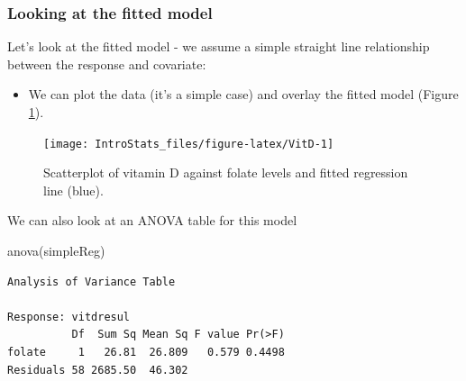 \documentclass[
  oneside]{krantz}
\newenvironment{Shaded}{\begin{snugshade}}{\end{snugshade}}
\newcommand{\AttributeTok}[1]{\textcolor[rgb]{0.77,0.63,0.00}{#1}}
\newcommand{\CommentTok}[1]{\textcolor[rgb]{0.56,0.35,0.01}{\textit{#1}}}
\newcommand{\DecValTok}[1]{\textcolor[rgb]{0.00,0.00,0.81}{#1}}
\newcommand{\FunctionTok}[1]{\textcolor[rgb]{0.00,0.00,0.00}{#1}}
\newcommand{\NormalTok}[1]{#1}
\newcommand{\SpecialCharTok}[1]{\textcolor[rgb]{0.00,0.00,0.00}{#1}}
\newcommand{\StringTok}[1]{\textcolor[rgb]{0.31,0.60,0.02}{#1}}
\providecommand{\tightlist}{%
  \setlength{\itemsep}{0pt}\setlength{\parskip}{0pt}}
\begin{document}
\hypertarget{looking-at-the-fitted-model}{%
\subsubsection{Looking at the fitted model}\label{looking-at-the-fitted-model}}

Let's look at the fitted model - we assume a simple straight line relationship between the response and covariate:

\begin{itemize}
\tightlist
\item
  We can plot the data (it's a simple case) and overlay the fitted model (Figure \ref{fig:VitD}).
\end{itemize}

\begin{Shaded}
\end{Shaded}

\begin{figure}

{\centering \texttt{[image: IntroStats\_files/figure-latex/VitD-1]} 

}

\caption{Scatterplot of vitamin D against folate levels and fitted regression line (blue). }\label{fig:VitD}
\end{figure}

We can also look at an ANOVA table for this model

\begin{Shaded}
\begin{Highlighting}[]
\FunctionTok{anova}\NormalTok{(simpleReg)}
\end{Highlighting}
\end{Shaded}

\begin{verbatim}
Analysis of Variance Table

Response: vitdresul
          Df  Sum Sq Mean Sq F value Pr(>F)
folate     1   26.81  26.809   0.579 0.4498
Residuals 58 2685.50  46.302               
\end{verbatim}
\end{document}
